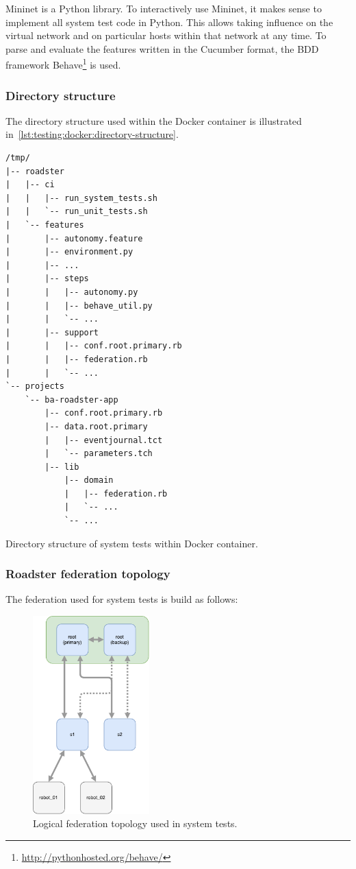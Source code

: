 Mininet is a Python library. To interactively use Mininet, it makes sense to
implement all system test code in Python. This allows taking influence on the
virtual network and on particular hosts within that network at any time. To
parse and evaluate the features written in the Cucumber format, the \gls{BDD}
framework Behave\footnote{\url{http://pythonhosted.org/behave/}} is used.

\subsubsection{Directory structure}

The directory structure used within the Docker container is illustrated
in~\autoref{lst:testing:docker:directory-structure}.

\begin{listing}
	\begin{verbatim}
/tmp/
|-- roadster
|   |-- ci
|   |   |-- run_system_tests.sh
|   |   `-- run_unit_tests.sh
|   `-- features
|       |-- autonomy.feature
|       |-- environment.py
|       |-- ...
|       |-- steps
|       |   |-- autonomy.py
|       |   |-- behave_util.py
|       |   `-- ...
|       |-- support
|       |   |-- conf.root.primary.rb
|       |   |-- federation.rb
|       |   `-- ...
`-- projects
	`-- ba-roadster-app
		|-- conf.root.primary.rb
		|-- data.root.primary
		|   |-- eventjournal.tct
		|   `-- parameters.tch
		|-- lib
			|-- domain
			|   |-- federation.rb
			|   `-- ...
			`-- ...
	\end{verbatim}
	\caption{Directory structure of system tests within Docker container.}
	\label{lst:testing:docker:directory-structure}
\end{listing}

\subsubsection{Roadster federation topology}
The federation used for system tests is build as follows:
\begin{figure}[]
	\center
	\includegraphics[width=0.4\textwidth]{img/logical_federation_setup.pdf}
	\caption{Logical federation topology used in system tests.}
	\label{fig:testing:topo:logic}
\end{figure}

